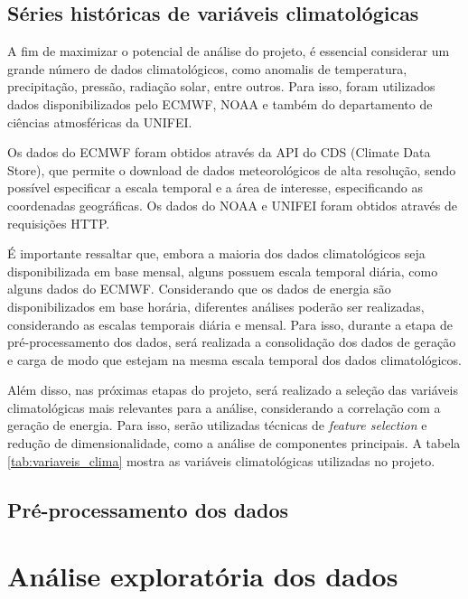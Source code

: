 \begin{figure}[!ht]
	{}
	{}
\end{figure}

\subsection{Séries históricas de variáveis climatológicas}
A fim de maximizar o potencial de análise do projeto, é essencial considerar um grande número de dados climatológicos, 
como anomalis de temperatura, precipitação, pressão, radiação solar, entre outros. Para isso, foram utilizados dados 
disponibilizados pelo ECMWF, NOAA e também do departamento de ciências atmosféricas da UNIFEI.

Os dados do ECMWF foram obtidos através da API do CDS (Climate Data Store), que permite o download de dados 
meteorológicos de alta resolução, sendo possível especificar a escala temporal e a área de interesse, especificando as 
coordenadas geográficas. Os dados do NOAA e UNIFEI foram obtidos através de requisições HTTP.

É importante ressaltar que, embora a maioria dos dados climatológicos seja disponibilizada em base mensal, alguns
possuem escala temporal diária, como alguns dados do ECMWF. Considerando que os dados de energia são disponibilizados em
base horária, diferentes análises poderão ser realizadas, considerando as escalas temporais diária e mensal. Para isso,
durante a etapa de pré-processamento dos dados, será realizada a consolidação dos dados de geração e carga de modo que
estejam na mesma escala temporal dos dados climatológicos.

Além disso, nas próximas etapas do projeto, será realizado a seleção das variáveis climatológicas mais relevantes para
a análise, considerando a correlação com a geração de energia. Para isso, serão utilizadas técnicas de \textit{feature
selection} e redução de dimensionalidade, como a análise de componentes principais. A tabela \ref{tab:variaveis_clima}
mostra as variáveis climatológicas utilizadas no projeto.

\subsection{Pré-processamento dos dados}
\lipsum[1]

\section{Análise exploratória dos dados}
\lipsum[1]

